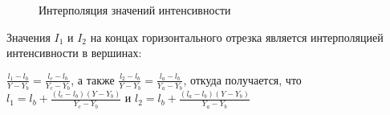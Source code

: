 \documentclass[a4paper,14pt]{extreport}
\begin{document}
	\begin{figure}[H]
		\caption{Интерполяция значений интенсивности}
		\label{ris:image}
	\end{figure}
Значения \begin{math}I_1\end{math} и \begin{math}I_2\end{math} на концах горизонтального отрезка является интерполяцией
интенсивности в вершинах:
\begin{center}
		\begin{math}
		\frac{
		l_1 - l_b
  		}{
  		Y - Y_b
		} = \frac{
		l_c - l_b
  		}{
  		Y_c - Y_b
		}
		\end{math}, а также 
		\begin{math}
		\frac{
		l_2 - l_b
  		}{
  		Y - Y_b
		} = \frac{
		l_a - l_b
  		}{
  		Y_a - Y_b
		}
		\end{math}, откуда получается, что 
		\begin{math}
		l_1 = l_b + \frac{
		(l_c - l_b)(Y - Y_b)
  		}{
  		Y_c - Y_b
		} 
		\end{math} и
		\begin{math}
		l_2 = l_b + \frac{
		(l_a - l_b)(Y - Y_b)
  		}{
  		Y_a - Y_b
		} 
		\end{math}
\end{center}
\end{document}
